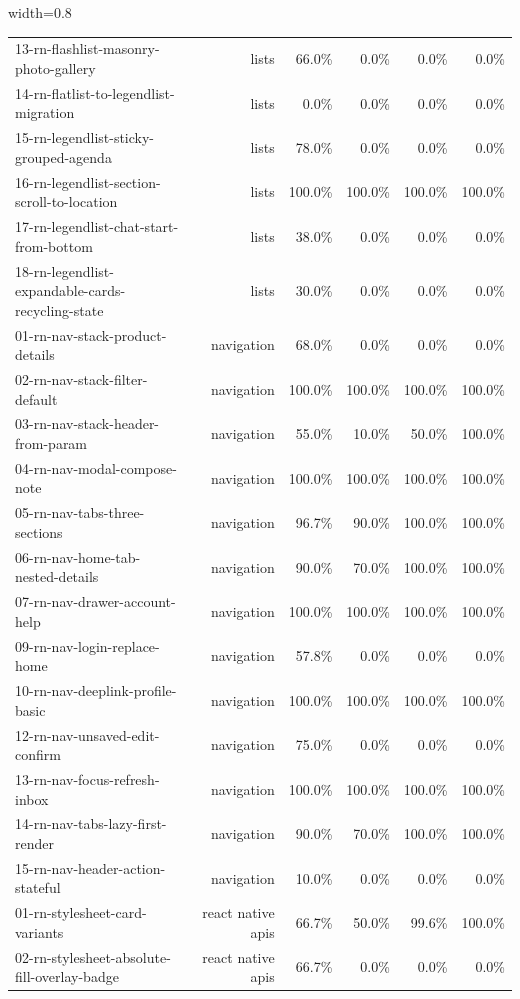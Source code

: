 \begin{table}[htbp]
\begin{adjustbox}{width=0.8\textwidth}
\begin{tabular}{lrrrrr}
13-rn-flashlist-masonry-photo-gallery & lists & 66.0\% & 0.0\% & 0.0\% & 0.0\% \\
14-rn-flatlist-to-legendlist-migration & lists & 0.0\% & 0.0\% & 0.0\% & 0.0\% \\
15-rn-legendlist-sticky-grouped-agenda & lists & 78.0\% & 0.0\% & 0.0\% & 0.0\% \\
16-rn-legendlist-section-scroll-to-location & lists & 100.0\% & 100.0\% & 100.0\% & 100.0\% \\
17-rn-legendlist-chat-start-from-bottom & lists & 38.0\% & 0.0\% & 0.0\% & 0.0\% \\
18-rn-legendlist-expandable-cards-recycling-state & lists & 30.0\% & 0.0\% & 0.0\% & 0.0\% \\
01-rn-nav-stack-product-details & navigation & 68.0\% & 0.0\% & 0.0\% & 0.0\% \\
02-rn-nav-stack-filter-default & navigation & 100.0\% & 100.0\% & 100.0\% & 100.0\% \\
03-rn-nav-stack-header-from-param & navigation & 55.0\% & 10.0\% & 50.0\% & 100.0\% \\
04-rn-nav-modal-compose-note & navigation & 100.0\% & 100.0\% & 100.0\% & 100.0\% \\
05-rn-nav-tabs-three-sections & navigation & 96.7\% & 90.0\% & 100.0\% & 100.0\% \\
06-rn-nav-home-tab-nested-details & navigation & 90.0\% & 70.0\% & 100.0\% & 100.0\% \\
07-rn-nav-drawer-account-help & navigation & 100.0\% & 100.0\% & 100.0\% & 100.0\% \\
09-rn-nav-login-replace-home & navigation & 57.8\% & 0.0\% & 0.0\% & 0.0\% \\
10-rn-nav-deeplink-profile-basic & navigation & 100.0\% & 100.0\% & 100.0\% & 100.0\% \\
12-rn-nav-unsaved-edit-confirm & navigation & 75.0\% & 0.0\% & 0.0\% & 0.0\% \\
13-rn-nav-focus-refresh-inbox & navigation & 100.0\% & 100.0\% & 100.0\% & 100.0\% \\
14-rn-nav-tabs-lazy-first-render & navigation & 90.0\% & 70.0\% & 100.0\% & 100.0\% \\
15-rn-nav-header-action-stateful & navigation & 10.0\% & 0.0\% & 0.0\% & 0.0\% \\
01-rn-stylesheet-card-variants & react native apis & 66.7\% & 50.0\% & 99.6\% & 100.0\% \\
02-rn-stylesheet-absolute-fill-overlay-badge & react native apis & 66.7\% & 0.0\% & 0.0\% & 0.0\% \\

\end{tabular}
\end{adjustbox}
\end{table}
